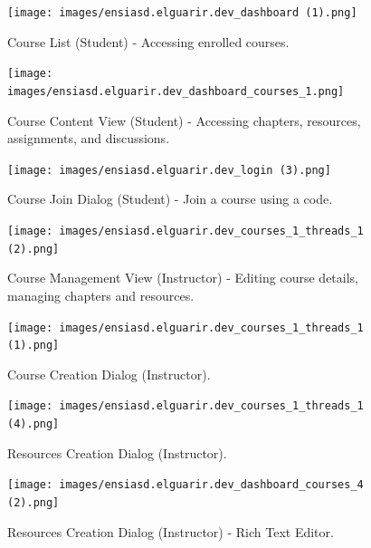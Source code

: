 \documentclass[12pt,a4paper]{article}
\begin{document}
\begin{figure}[H]
    \centering
    \texttt{[image: images/ensiasd.elguarir.dev\_dashboard (1).png]}
    \caption{Course List (Student) - Accessing enrolled courses.}
    \label{fig:screen-course-list-student}
\end{figure}
\FloatBarrier

\begin{figure}[H]
    \centering
    \texttt{[image: images/ensiasd.elguarir.dev\_dashboard\_courses\_1.png]}
    \caption{Course Content View (Student) - Accessing chapters, resources, assignments, and discussions.}
    \label{fig:screen-course-content-student}
\end{figure}
\FloatBarrier

\begin{figure}[H]
    \centering
    \texttt{[image: images/ensiasd.elguarir.dev\_login (3).png]}
    \caption{Course Join Dialog (Student) - Join a course using a code.}
    \label{fig:screen-course-join}
\end{figure}
\FloatBarrier

\clearpage

\begin{figure}[H]
    \centering
    \texttt{[image: images/ensiasd.elguarir.dev\_courses\_1\_threads\_1 (2).png]}
    \caption{Course Management View (Instructor) - Editing course details, managing chapters and resources.}
    \label{fig:screen-course-management}
\end{figure}
\FloatBarrier

\begin{figure}[H]
    \centering
    \texttt{[image: images/ensiasd.elguarir.dev\_courses\_1\_threads\_1 (1).png]}
    \caption{Course Creation Dialog (Instructor).}
    \label{fig:screen-course-creation}
\end{figure}
\FloatBarrier

\begin{figure}[H]
    \centering
    \texttt{[image: images/ensiasd.elguarir.dev\_courses\_1\_threads\_1 (4).png]}
    \caption{Resources Creation Dialog (Instructor).}
    \label{fig:screen-resource-creation}
\end{figure}
\FloatBarrier

\begin{figure}[H]
    \centering
    \texttt{[image: images/ensiasd.elguarir.dev\_dashboard\_courses\_4 (2).png]}
    \caption{Resources Creation Dialog (Instructor) - Rich Text Editor.}
    \label{fig:screen-resource-editor}
\end{figure}
\FloatBarrier
\end{document}
